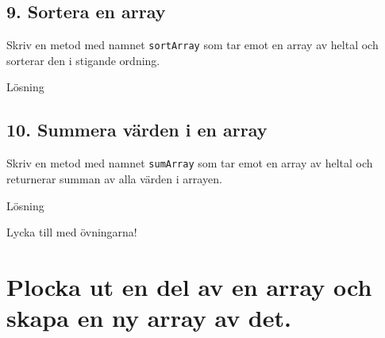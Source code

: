 \hypertarget{sortera-en-array}{%
\subsection{9. Sortera en array}\label{sortera-en-array}}

Skriv en metod med namnet \texttt{sortArray} som tar emot en array av
heltal och sorterar den i stigande ordning.

Lösning

\hypertarget{cb8}{}
\begin{Shaded}
\begin{Highlighting}[]
   \OperatorTok{(}\OperatorTok{[]}\OperatorTok{)} \OperatorTok{\{}
    \OperatorTok{(}\OperatorTok{);}
\OperatorTok{\}}
\end{Highlighting}
\end{Shaded}

\hypertarget{summera-vuxe4rden-i-en-array}{%
\subsection{10. Summera värden i en
array}\label{summera-vuxe4rden-i-en-array}}

Skriv en metod med namnet \texttt{sumArray} som tar emot en array av
heltal och returnerar summan av alla värden i arrayen.

Lösning

\hypertarget{cb9}{}
\begin{Shaded}
\begin{Highlighting}[]
   \OperatorTok{(}\OperatorTok{[]}\OperatorTok{)} \OperatorTok{\{}
    \OperatorTok{=} \OperatorTok{;}
\OperatorTok{+=}\OperatorTok{[}\OperatorTok{];}
    \OperatorTok{;}
\OperatorTok{\}}
\end{Highlighting}
\end{Shaded}

Lycka till med övningarna!

\hypertarget{plocka-ut-en-del-av-en-array-och-skapa-en-ny-array-av-det.}{%
\section{Plocka ut en del av en array och skapa en ny array av
det.}\label{plocka-ut-en-del-av-en-array-och-skapa-en-ny-array-av-det.}}

